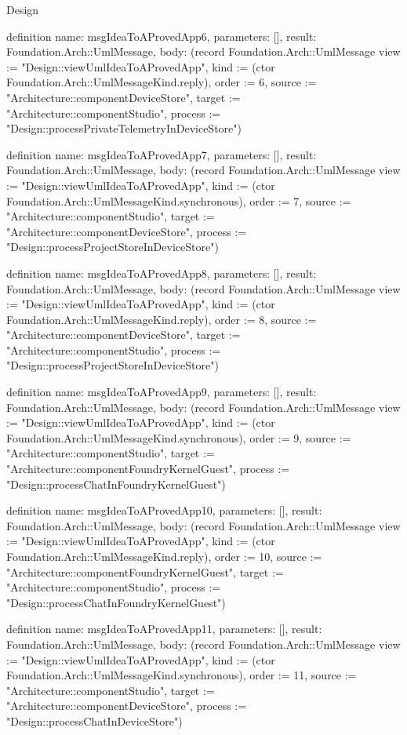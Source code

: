 \begin{lexlean}{Design}
\begin{semanticmodule}
definition{
  name: msgIdeaToAProvedApp6,
  parameters: [],
  result: Foundation.Arch::UmlMessage,
  body: (record Foundation.Arch::UmlMessage {view := "Design::viewUmlIdeaToAProvedApp", kind := (ctor Foundation.Arch::UmlMessageKind.reply), order := 6, source := "Architecture::componentDeviceStore", target := "Architecture::componentStudio", process := "Design::processPrivateTelemetryInDeviceStore"})
}

definition{
  name: msgIdeaToAProvedApp7,
  parameters: [],
  result: Foundation.Arch::UmlMessage,
  body: (record Foundation.Arch::UmlMessage {view := "Design::viewUmlIdeaToAProvedApp", kind := (ctor Foundation.Arch::UmlMessageKind.synchronous), order := 7, source := "Architecture::componentStudio", target := "Architecture::componentDeviceStore", process := "Design::processProjectStoreInDeviceStore"})
}

definition{
  name: msgIdeaToAProvedApp8,
  parameters: [],
  result: Foundation.Arch::UmlMessage,
  body: (record Foundation.Arch::UmlMessage {view := "Design::viewUmlIdeaToAProvedApp", kind := (ctor Foundation.Arch::UmlMessageKind.reply), order := 8, source := "Architecture::componentDeviceStore", target := "Architecture::componentStudio", process := "Design::processProjectStoreInDeviceStore"})
}

definition{
  name: msgIdeaToAProvedApp9,
  parameters: [],
  result: Foundation.Arch::UmlMessage,
  body: (record Foundation.Arch::UmlMessage {view := "Design::viewUmlIdeaToAProvedApp", kind := (ctor Foundation.Arch::UmlMessageKind.synchronous), order := 9, source := "Architecture::componentStudio", target := "Architecture::componentFoundryKernelGuest", process := "Design::processChatInFoundryKernelGuest"})
}

definition{
  name: msgIdeaToAProvedApp10,
  parameters: [],
  result: Foundation.Arch::UmlMessage,
  body: (record Foundation.Arch::UmlMessage {view := "Design::viewUmlIdeaToAProvedApp", kind := (ctor Foundation.Arch::UmlMessageKind.reply), order := 10, source := "Architecture::componentFoundryKernelGuest", target := "Architecture::componentStudio", process := "Design::processChatInFoundryKernelGuest"})
}

definition{
  name: msgIdeaToAProvedApp11,
  parameters: [],
  result: Foundation.Arch::UmlMessage,
  body: (record Foundation.Arch::UmlMessage {view := "Design::viewUmlIdeaToAProvedApp", kind := (ctor Foundation.Arch::UmlMessageKind.synchronous), order := 11, source := "Architecture::componentStudio", target := "Architecture::componentDeviceStore", process := "Design::processChatInDeviceStore"})
}


\end{semanticmodule}
\end{lexlean}
